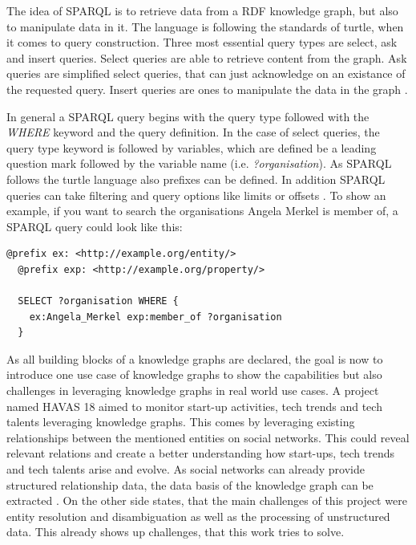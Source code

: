 \documentclass[a4paper,oneside,bibliography=totoc]{scrbook}
\begin{document}
The idea of \ac{SPARQL} is to retrieve data from a \ac{RDF} knowledge graph, but also to manipulate data in it. The language is following the standards of turtle, when it comes to query construction. Three most essential query types are select, ask and insert queries. Select queries are able to retrieve content from the graph. Ask queries are simplified select queries, that can just acknowledge on an existance of the requested query. Insert queries are ones to manipulate the data in the graph \cite{VillazonTerrazas2017}.

In general a \ac{SPARQL} query begins with the query type followed with the \textit{WHERE} keyword and the query definition. In the case of select queries, the query type keyword is followed by variables, which are defined be a leading question mark followed by the variable name (i.e. \textit{?organisation}). As \ac{SPARQL} follows the turtle language also prefixes can be defined. In addition \ac{SPARQL} queries can take filtering and query options like limits or offsets \cite{VillazonTerrazas2017}. To show an example, if you want to search the organisations Angela Merkel is member of, a \ac{SPARQL} query could look like this:

\begin{lstlisting}[language=SPARQL, caption=Example of a SPARQL Query, label=lst:turtle_example]
  @prefix ex: <http://example.org/entity/>
  @prefix exp: <http://example.org/property/>
  
  SELECT ?organisation WHERE {
    ex:Angela_Merkel exp:member_of ?organisation
  }
  \end{lstlisting}

As all building blocks of a knowledge graphs are declared, the goal is now to introduce one use case of knowledge graphs to show the capabilities but also challenges in leveraging knowledge graphs in real world use cases. A project named HAVAS 18 aimed to monitor start-up activities, tech trends and tech talents leveraging knowledge graphs. This comes by leveraging existing relationships between the mentioned entities on social networks. This could reveal relevant relations and create a better understanding how start-ups, tech trends and tech talents arise and evolve. As social networks can already provide structured relationship data, the data basis of the knowledge graph can be extracted \cite{Monti2017}. On the other side \citet{Monti2017} states, that the main challenges of this project were entity resolution and disambiguation as well as the processing of unstructured data. This already shows up challenges, that this work tries to solve.
\end{document}
